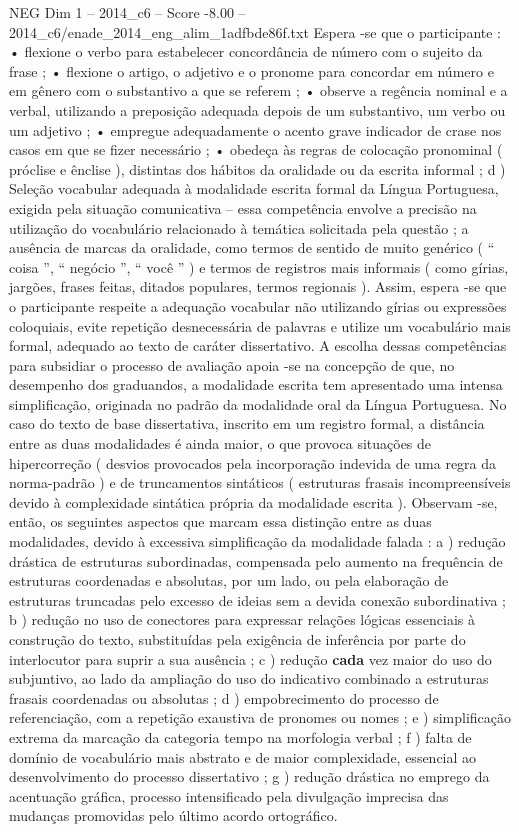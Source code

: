 \begin{textsample}{NEG Dim 1 – 2014\_c6 – Score -8.00 – 2014\_c6/enade\_2014\_eng\_alim\_1adfbde86f.txt}
Espera -se que o participante : • flexione o verbo para estabelecer concordância de número com o sujeito da frase ; • flexione o artigo, o adjetivo e o pronome para concordar em número e em gênero com o substantivo a que se referem ; • observe a regência nominal e a verbal, utilizando a preposição adequada depois de um substantivo, um verbo ou um adjetivo ; • empregue adequadamente o acento grave indicador de crase nos casos em que se fizer necessário ; • obedeça às regras de colocação pronominal ( próclise e ênclise ), distintas dos hábitos da oralidade ou da escrita informal ; d ) Seleção vocabular adequada à modalidade escrita formal da Língua Portuguesa, exigida pela situação comunicativa – essa competência envolve a precisão na utilização do vocabulário relacionado à temática solicitada pela questão ; a ausência de marcas da oralidade, como termos de sentido de muito genérico ( “ coisa ”, “ negócio ”, “ você ” ) e termos de registros mais informais ( como gírias, jargões, frases feitas, ditados populares, termos regionais ).
Assim, espera -se que o participante respeite a adequação vocabular não utilizando gírias ou expressões coloquiais, evite repetição desnecessária de palavras e utilize um vocabulário mais formal, adequado ao texto de caráter dissertativo.
A escolha dessas competências para subsidiar o processo de avaliação apoia -se na concepção de que, no desempenho dos graduandos, a modalidade escrita tem apresentado uma intensa simplificação, originada no padrão da modalidade oral da Língua Portuguesa.
No caso do texto de base dissertativa, inscrito em um registro formal, a distância entre as duas modalidades é ainda maior, o que provoca situações de hipercorreção ( desvios provocados pela incorporação indevida de uma regra da norma-padrão ) e de truncamentos sintáticos ( estruturas frasais incompreensíveis devido à complexidade sintática própria da modalidade escrita ).
Observam -se, então, os seguintes aspectos que marcam essa distinção entre as duas modalidades, devido à excessiva simplificação da modalidade falada : a ) redução drástica de estruturas subordinadas, compensada pelo aumento na frequência de estruturas coordenadas e absolutas, por um lado, ou pela elaboração de estruturas truncadas pelo excesso de ideias sem a devida conexão subordinativa ; b ) redução no uso de conectores para expressar relações lógicas essenciais à construção do texto, substituídas pela exigência de inferência por parte do interlocutor para suprir a sua ausência ; c ) redução \textbf{cada} vez maior do uso do subjuntivo, ao lado da ampliação do uso do indicativo combinado a estruturas frasais coordenadas ou absolutas ; d ) empobrecimento do processo de referenciação, com a repetição exaustiva de pronomes ou nomes ; e ) simplificação extrema da marcação da categoria tempo na morfologia verbal ; f ) falta de domínio de vocabulário mais abstrato e de maior complexidade, essencial ao desenvolvimento do processo dissertativo ; g ) redução drástica no emprego da acentuação gráfica, processo intensificado pela divulgação imprecisa das mudanças promovidas pelo último acordo ortográfico.

\end{textsample}
